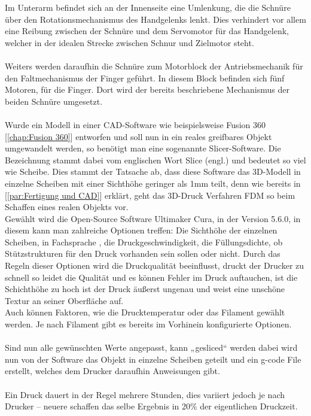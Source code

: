 \documentclass[titlepage,12pt,twoside]{article}
\begin{document}
\hfill \break
Im Unterarm befindet sich an der Innenseite eine Umlenkung, die die Schnüre über den Rotationsmechanismus des Handgelenks lenkt. Dies verhindert vor allem eine Reibung zwischen der Schnüre und dem Servomotor für das Handgelenk, welcher in der 
idealen Strecke zwischen Schnur und Zielmotor steht. \\
\\
Weiters werden daraufhin die Schnüre zum Motorblock der Antriebsmechanik für den Faltmechanismus der Finger geführt. In diesem Block befinden sich fünf Motoren, für die Finger.
Dort wird der bereits beschriebene Mechanismus der beiden Schnüre umgesetzt. \\
\\
Wurde ein Modell in einer CAD-Software wie beispielsweise Fusion 360 [\textcolor{blue}{\autoref{chap:Fusion 360}}] entworfen und soll nun in ein reales greifbares Objekt umgewandelt werden, so benötigt man eine sogenannte Slicer-Software. Die Bezeichnung  stammt dabei vom englischen 
Wort Slice (engl.) und bedeutet so viel wie Scheibe. Dies stammt der Tatsache ab, dass diese Software das 3D-Modell in einzelne Scheiben mit einer Sichthöhe geringer als 1mm teilt, denn wie bereits in [\textcolor{blue}{\autoref{par:Fertigung und CAD}}] erklärt, geht das 3D-Druck Verfahren 
FDM so beim Schaffen eines realen Objekts vor. \\
Gewählt wird die Open-Source Software Ultimaker Cura, in der Version 5.6.0, in diesem kann man zahlreiche Optionen treffen: Die Sichthöhe der einzelnen Scheiben, in Fachsprache , die Druckgeschwindigkeit, die Füllungsdichte, ob Stützstrukturen für den 
Druck vorhanden sein sollen oder nicht. Durch das Regeln dieser Optionen wird die Druckqualität beeinflusst, druckt der Drucker zu schnell so leidet die Qualität und es können Fehler im Druck auftauchen, ist die Schichthöhe zu hoch ist der Druck 
äußerst ungenau und weist eine unschöne Textur an seiner Oberfläche auf. \\
Auch können Faktoren, wie die Drucktemperatur oder das Filament gewählt werden. Je nach Filament gibt es bereits im Vorhinein konfigurierte Optionen. \\
\\
Sind nun alle gewünschten Werte angepasst, kann „gesliced“ werden dabei wird nun von der Software das Objekt in einzelne Scheiben geteilt und ein g-code File erstellt, welches dem Drucker daraufhin Anweisungen gibt. \\
\\
Ein Druck dauert in der Regel mehrere Stunden, dies variiert jedoch je nach Drucker – neuere schaffen das selbe Ergebnis in 20\% der eigentlichen Druckzeit. \\
\end{document}
